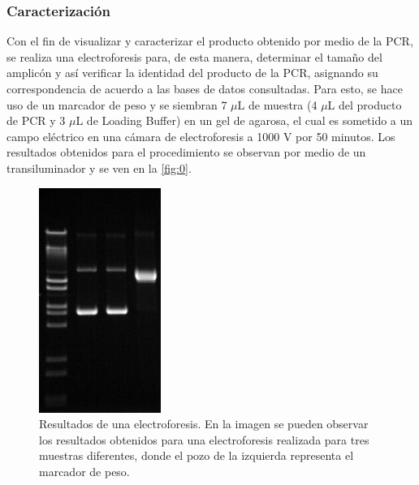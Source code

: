 \documentclass[12pt]{article}
\begin{document}
		\subsubsection{Caracterizaci\'on}
		Con el fin de visualizar y caracterizar el producto obtenido por medio de la PCR, se realiza una electroforesis para, de esta manera, determinar el tamaño del amplicón y así verificar la identidad del producto de la PCR, asignando su correspondencia de acuerdo a las bases de datos consultadas. Para esto, se hace uso de un marcador de peso y se siembran 7 $\mu$L de muestra (4 $\mu$L del producto de PCR y 3 $\mu$L de Loading Buffer) en un gel de agarosa, el cual es sometido a un campo eléctrico en una cámara de electroforesis a 1000 V por 50 minutos. Los resultados obtenidos para el procedimiento se observan por medio de un transiluminador y se ven en la \autoref{fig:0}.
		\begin{figure}[h]
			\centering
			\includegraphics[width = 0.25\linewidth]{electro}
			\caption{Resultados de una electroforesis. En la imagen se pueden observar los resultados obtenidos para una electroforesis realizada para tres muestras diferentes, donde el pozo de la izquierda representa el marcador de peso.}
			\label{fig:0}
		\end{figure}
	
\end{document}
